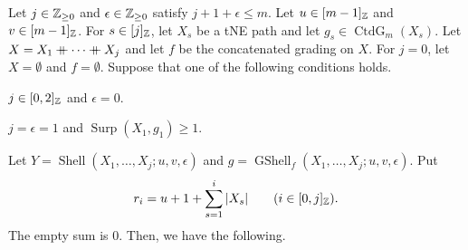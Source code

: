 \begin{lemma}\label{lem:shell}
Let $j\in\mathbb Z_{\ge0}$ and $\epsilon\in\mathbb Z_{\ge0}$ satisfy $j+1+\epsilon\le m$. Let $u\in[m-1]_{\mathbb Z}$ and $v\in[m-1]_{\mathbb Z}$.
For $s\in[j]_{\mathbb Z}$, let $X_s$ be a tNE path and let $g_s\in\operatorname{CtdG}_m(X_s)$.
Let $X=X_1\mathbin{+\mkern-10mu+}\cdots\mathbin{+\mkern-10mu+} X_j$ and let $f$ be the concatenated grading on $X$.
For $j=0$, let $X=\emptyset$ and $f=\emptyset$.
Suppose that one of the following conditions holds.
\begin{hypotheses}
\item\label{hyp:shell-preserving} $j\in[0,2]_{\mathbb Z}$ and $\epsilon=0$.
\item\label{hyp:shell-draining} $j=\epsilon=1$ and $\operatorname{Surp}(X_1,g_1)\ge1$.
\end{hypotheses}
Let $Y=\operatorname{Shell}(X_1,\ldots,X_j;u,v,\epsilon)$ and $g=\operatorname{GShell}_{f}(X_1,\ldots,X_j;u,v,\epsilon)$.
Put
\[
 r_i=u+1+\sum_{s=1}^i|X_s|\qquad(i\in[0,j]_{\mathbb Z}).
\]
The empty sum is $0$.
Then, we have the following.


\end{lemma}
